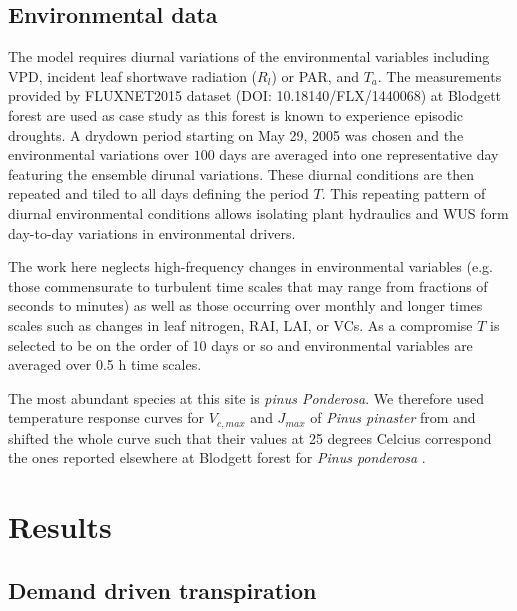 \documentclass[utf8]{frontiersSCNS} %
\begin{document}
\subsection{Environmental data} 
The model requires diurnal variations of the environmental variables including VPD, incident leaf shortwave radiation ($R_l$) or PAR, and $T_a$. The measurements provided by FLUXNET2015 dataset (DOI: 10.18140/FLX/1440068) at Blodgett forest are used as case study as this forest is known to experience episodic droughts. A drydown period starting on May 29, 2005 was chosen and the environmental variations over $100$ days are averaged into one representative day featuring the ensemble dirunal variations. These diurnal conditions are then repeated and tiled to all days defining the period $T$. This repeating pattern of diurnal environmental conditions allows isolating plant hydraulics and WUS form day-to-day variations in environmental drivers.

The work here neglects high-frequency changes in environmental variables (e.g. those commensurate to turbulent time scales that may range from fractions of seconds to minutes) as well as those occurring over monthly and longer times scales such as changes in leaf nitrogen, RAI, LAI, or VCs. As a compromise $T$ is selected to be on the order of 10 days or so and environmental variables are averaged over 0.5 h time scales.

The most abundant species at this site is \textit{pinus Ponderosa}. We therefore used temperature response curves for $V_{c,max}$ and $J_{max}$ of \textit{Pinus pinaster} from \citep{medlyn_temperature_2002} and shifted the whole curve such that their values at 25 degrees Celcius correspond the ones reported elsewhere at Blodgett forest for \textit{Pinus ponderosa} \citep{panek2004ozone}.

\section{Results}

\subsection{Demand driven transpiration}
\end{document}
